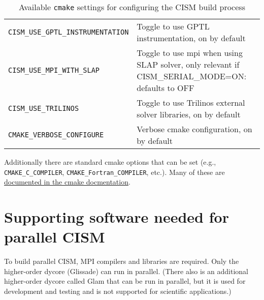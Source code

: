 \begin{table}
\begin{tabular}{ l | p{8cm} }
\texttt{CISM\_USE\_GPTL\_INSTRUMENTATION} & Toggle to use GPTL instrumentation, on by default \\

\texttt{CISM\_USE\_MPI\_WITH\_SLAP} & Toggle to use mpi when using SLAP solver, only relevant if CISM\_SERIAL\_MODE=ON: defaults to OFF \\

\texttt{CISM\_USE\_TRILINOS} & Toggle to use Trilinos external solver libraries, on by default \\

\texttt{CMAKE\_VERBOSE\_CONFIGURE} & Verbose cmake configuration, on by default \\







\hline
\end{tabular}
  \caption{Available \texttt{cmake} settings for configuring the CISM build process}
  \label{cmake-options}
\end{table}

Additionally there are standard cmake options that can be set (e.g., \texttt{CMAKE\_C\_COMPILER}, \texttt{CMAKE\_Fortran\_COMPILER}, etc.).  Many of these are \href{http://www.cmake.org/Wiki/CMake_Useful_Variables}{documented in the cmake docmentation}.



\section{Supporting software needed for parallel CISM}
To build parallel CISM, MPI compilers and libraries are required.  
Only the higher-order dycore (Glissade) can run in parallel.  (There also is an
additional higher-order dycore called Glam that can be run in parallel, but it is used
for development and testing and is not supported for scientific applications.)

